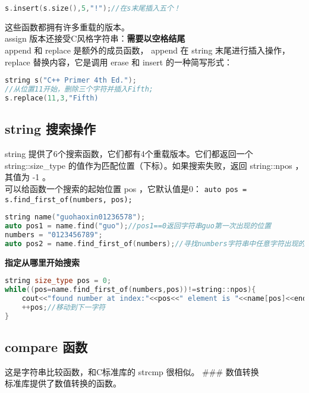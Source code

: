 \documentclass[
  a4paper,
  oneside,tablecaptionabove
]{scrbook}
\begin{document}
\begin{lstlisting}[language={C++}]
s.insert(s.size(),5,"!");//在s末尾插入五个！
\end{lstlisting}

这些函数都拥有许多重载的版本。\\
assign 版本还接受C风格字符串：\textbf{需要以空格结尾}\\
append 和 replace 是额外的成员函数， append 在 string 末尾进行插入操作，
replace 替换内容，它是调用 erase 和 insert 的一种简写形式：

\begin{lstlisting}[language={C++}]
string s("C++ Primer 4th Ed.");
//从位置11开始，删除三个字符并插入Fifth;
s.replace(11,3,"Fifth)
\end{lstlisting}

\subsection{string 搜索操作}\label{string-ux641cux7d22ux64cdux4f5c}

string 提供了6个搜索函数，它们都有4个重载版本。它们都返回一个
string::size\_type 的值作为匹配位置（下标）。如果搜索失败，返回
string::npos ，其值为 -1 。\\
可以给函数一个搜索的起始位置 pos ，它默认值是0：
\lstinline!auto pos = s.find_first_of(numbers, pos);!

\begin{lstlisting}[language={C++}]
string name("guohaoxin01236578");
auto pos1 = name.find("guo");//pos1==0返回字符串guo第一次出现的位置
numbers = "0123456789";
auto pos2 = name.find_first_of(numbers);//寻找numbers字符串中任意字符出现的位置，find_first_not_of
\end{lstlisting}

\textbf{指定从哪里开始搜索}

\begin{lstlisting}[language={C++}]
string size_type pos = 0;
while((pos=name.find_first_of(numbers,pos))!=string::npos){
    cout<<"found number at index:"<<pos<<" element is "<<name[pos]<<endl;
    ++pos;//移动到下一字符
}
\end{lstlisting}

\subsection{compare 函数}\label{compare-ux51fdux6570}

这是字符串比较函数，和C标准库的 strcmp 很相似。 \#\#\# 数值转换\\
标准库提供了数值转换的函数。
\end{document}
